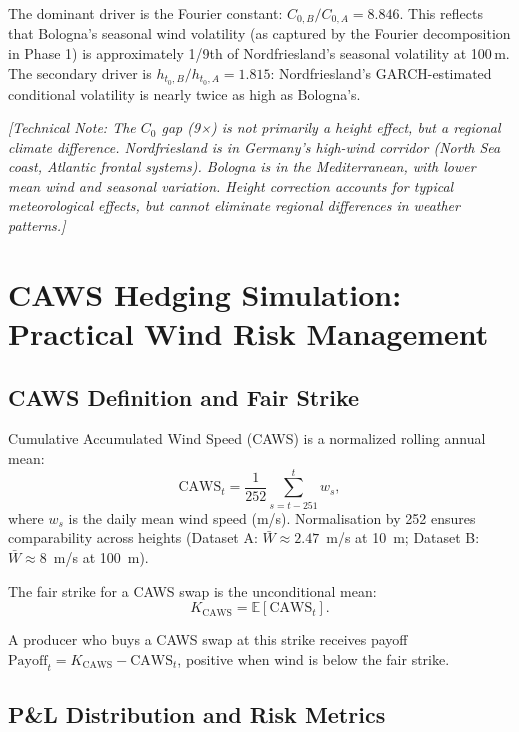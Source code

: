 \documentclass[11pt, a4paper, twoside]{article}
\begin{document}
The dominant driver is the Fourier constant: $C_{0,B} / C_{0,A} = 8.846$. This reflects that Bologna's seasonal wind volatility (as captured by the Fourier decomposition in Phase 1) is approximately 1/9th of Nordfriesland's seasonal volatility at 100\,m. The secondary driver is $h_{t_0,B} / h_{t_0,A} = 1.815$: Nordfriesland's GARCH-estimated conditional volatility is nearly twice as high as Bologna's.

\textit{[Technical Note: The $C_0$ gap (9×) is not primarily a height effect, but a regional climate difference. Nordfriesland is in Germany's high-wind corridor (North Sea coast, Atlantic frontal systems). Bologna is in the Mediterranean, with lower mean wind and seasonal variation. Height correction accounts for typical meteorological effects, but cannot eliminate regional differences in weather patterns.]}

\section{CAWS Hedging Simulation: Practical Wind Risk Management}

\subsection{CAWS Definition and Fair Strike}

Cumulative Accumulated Wind Speed (CAWS) is a normalized rolling annual mean:
\begin{equation}
\text{CAWS}_t = \frac{1}{252} \sum_{s=t-251}^{t} w_s,
\end{equation}
where $w_s$ is the daily mean wind speed (m/s). Normalisation by 252 ensures comparability across heights (Dataset A: $\bar{W} \approx 2.47$~m/s at 10~m; Dataset B: $\bar{W} \approx 8$~m/s at 100~m).

The fair strike for a CAWS swap is the unconditional mean:
\begin{equation}
K_{\text{CAWS}} = \mathbb{E}[\text{CAWS}_t].
\end{equation}

A producer who buys a CAWS swap at this strike receives payoff $\text{Payoff}_t = K_{\text{CAWS}} - \text{CAWS}_t$, positive when wind is below the fair strike.

\subsection{P\&L Distribution and Risk Metrics}
\end{document}
